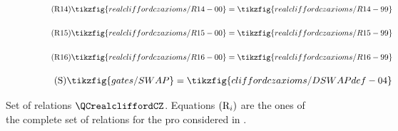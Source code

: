 \begin{figure}[ht]
{\begin{minipage}{.975\textwidth}
\begin{center}
\begin{subfigure}{1\textwidth}
            \begin{align}\label{R14}\tag{R14}\tikzfig{realcliffordczaxioms/R14-00}=\tikzfig{realcliffordczaxioms/R14-99}\end{align}
        \end{subfigure}\vspace{-0.5em}
        \begin{subfigure}{.76\textwidth}
            \begin{align}\label{R15}\tag{R15}\tikzfig{realcliffordczaxioms/R15-00}=\tikzfig{realcliffordczaxioms/R15-99}\end{align}
        \end{subfigure}\vspace{-0.5em}
        \begin{subfigure}{.76\textwidth}
            \begin{align}\label{R16}\tag{R16}\tikzfig{realcliffordczaxioms/R16-00}=\tikzfig{realcliffordczaxioms/R16-99}\end{align}
        \end{subfigure}\vspace{-0.5em}
        \begin{subfigure}{.46\textwidth}
            \begin{align}\label{real-DSWAPdef}\tag{S}\tikzfig{gates/SWAP}=\tikzfig{cliffordczaxioms/DSWAPdef-04}\end{align}
        \end{subfigure}
    \end{center}\end{minipage}}
    \caption{Set of relations $\QCrealcliffordCZ$. Equations $(\textup{R}_i)$ are the ones of the complete set of relations for the pro considered in \cite{SelingerRealStabilizer}.}
    \label{appendix:oldgraphicallanguage2}
\end{figure}



